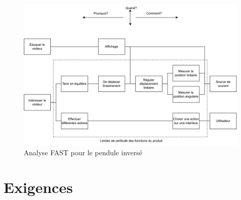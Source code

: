 \begin{figure}[H]
    \centering
    \includegraphics[width = \textwidth]{assets/figures/AnalyseFAST.svg}
    \caption{Analyse FAST pour le pendule inversé}
    \label{fig:AnalFAST}
\end{figure}

\section{Exigences}\label{sec:Exigences}

